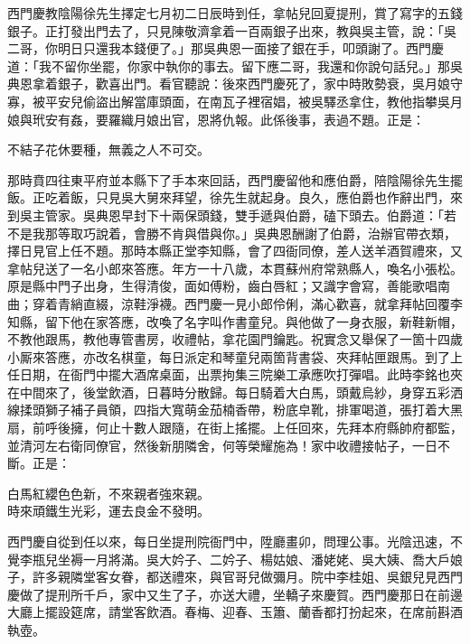 西門慶教陰陽徐先生擇定七月初二日辰時到任，拿帖兒回夏提刑，賞了寫字的五錢銀子。正打發出門去了，只見陳敬濟拿着一百兩銀子出來，教與吳主管，說：「吳二哥，你明日只還我本錢便了。」那吳典恩一面接了銀在手，叩頭謝了。西門慶道：「我不留你坐罷，你家中執你的事去。留下應二哥，我還和你說句話兒。」那吳典恩拿着銀子，歡喜出門。看官聽說：後來西門慶死了，家中時敗勢衰，吳月娘守寡，被平安兒偷盜出解當庫頭面，在南瓦子裡宿娼，被吳驛丞拿住，教他指攀吳月娘與玳安有姦，要羅織月娘出官，恩將仇報。此係後事，表過不題。正是：

\begin{myquote}
不結子花休要種，無義之人不可交。
\end{myquote}

那時賁四往東平府並本縣下了手本來回話，西門慶留他和應伯爵，陪陰陽徐先生擺飯。正吃着飯，只見吳大舅來拜望，徐先生就起身。良久，應伯爵也作辭出門，來到吳主管家。吳典恩早封下十兩保頭錢，雙手遞與伯爵，磕下頭去。伯爵道：「若不是我那等取巧說着，會勝不肯與借與你。」{}吳典恩酬謝了伯爵，治辦官帶衣類，擇日見官上任不題。那時本縣正堂李知縣，會了四衙同僚，差人送羊酒賀禮來，又拿帖兒送了一名小郎來答應。年方一十八歲，本貫蘇州府常熟縣人，喚名小張松。原是縣中門子出身，生得清俊，面如傅粉，齒白唇紅；又識字會寫，善能歌唱南曲；穿着青綃直綴，涼鞋淨襪。西門慶一見小郎伶俐，滿心歡喜，就拿拜帖回覆李知縣，留下他在家答應，改喚了名字叫作書童兒。與他做了一身衣服，新鞋新帽，不教他跟馬，教他專管書房，收禮帖，拿花園門鑰匙。祝實念又舉保了一箇十四歲小厮來答應，亦改名棋童，每日派定和琴童兒兩箇背書袋、夾拜帖匣跟馬。到了上任日期，在衙門中擺大酒席桌面，出票拘集三院樂工承應吹打彈唱。此時李銘也夾在中間來了，後堂飲酒，日暮時分散歸。每日騎着大白馬，頭戴烏紗，身穿五彩洒線揉頭獅子補子員領，四指大寬萌金茄楠香帶，粉底皁靴，排軍喝道，張打着大黑扇，前呼後擁，何止十數人跟隨，在街上搖擺。{}上任回來，先拜本府縣帥府都監，並清河左右衛同僚官，然後新朋隣舍，何等榮耀施為！家中收禮接帖子，一日不斷。正是：

\begin{myquote}
白馬紅纓色色新，不來親者強來親。\\時來頑鐵生光彩，運去良金不發明。
\end{myquote}

西門慶自從到任以來，每日坐提刑院衙門中，陞廳畫卯，問理公事。光陰迅速，不覺李瓶兒坐褥一月將滿。吳大妗子、二妗子、楊姑娘、潘姥姥、吳大姨、喬大戶娘子，許多親隣堂客女眷，都送禮來，與官哥兒做彌月。院中李桂姐、吳銀兒見西門慶做了提刑所千戶，家中又生了子，亦送大禮，坐轎子來慶賀。西門慶那日在前邊大廳上擺設筵席，請堂客飲酒。春梅、迎春、玉簫、蘭香都打扮起來，在席前斟酒執壺。

